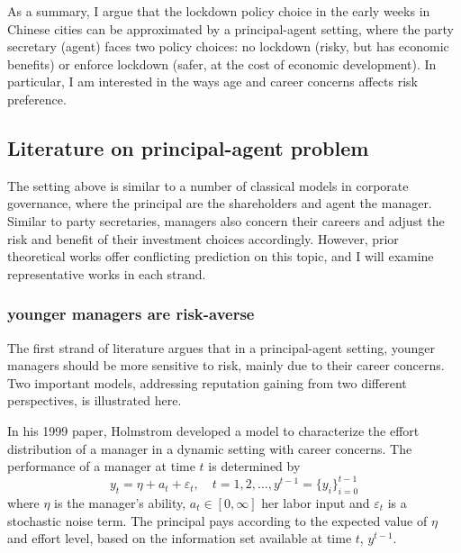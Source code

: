\documentclass{article}
\begin{document}
\begin{CJK}{UTF8}{gbsn}
As a summary, I argue that the lockdown policy choice in the early weeks in Chinese cities can be approximated by a principal-agent setting, where the party secretary (agent) faces two policy choices: no lockdown (risky, but has economic benefits) or enforce lockdown (safer, at the cost of economic development). In particular, I am interested in the ways age and career concerns affects risk preference.


\subsection{Literature on principal-agent problem} 

The setting above is similar to a number of classical models in corporate governance, where the principal are the shareholders and agent the manager. Similar to party secretaries, managers also concern their careers and adjust the risk and benefit of their investment choices accordingly. However, prior theoretical works offer conflicting prediction on this topic, and I will examine representative works in each strand.




\subsubsection{younger managers are risk-averse}
The first strand of literature argues that in a principal-agent setting, younger managers should be more sensitive to risk, mainly due to their career concerns. Two important models, addressing reputation gaining from two different perspectives, is illustrated here.

In his 1999 paper\cite{holmstrom1999}, Holmstrom developed a model to characterize the effort distribution of a manager in a dynamic setting with career concerns. The performance of a manager at time $t$ is determined by 
$$
y_{t}=\eta+a_{t}+\varepsilon_{t}, \quad t=1,2, \ldots, y^{t-1} = \{y_i\}_{i=0}^{t-1}
$$
where $\eta$ is the manager's ability, $a_{t} \in[0, \infty]$ her labor input and $\varepsilon_{t}$ is a stochastic noise term. The principal pays according to the expected value of $\eta$ and effort level, based on the information set available at time $t$, $y^{t-1}$. 


\end{CJK}
\end{document}
